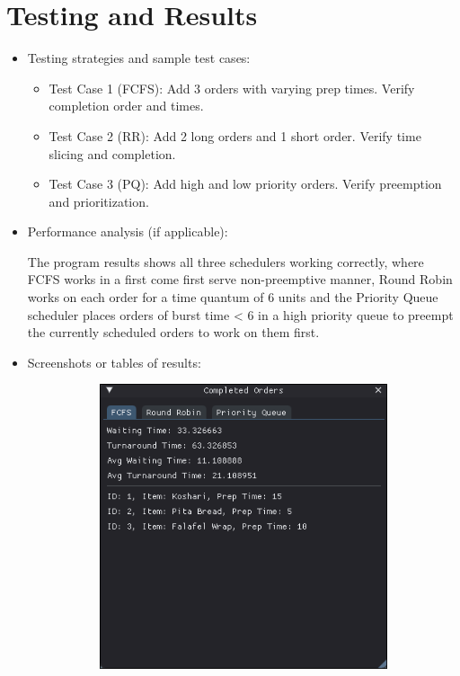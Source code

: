 \documentclass[a4paper,12pt]{article}
\begin{document}
\section{Testing and Results}
\RaggedRight %
\begin{itemize}
    \item Testing strategies and sample test cases: 

                \begin{itemize}
                    \item Test Case 1 (FCFS): Add 3 orders with varying prep times. Verify completion order and times.
                    \item Test Case 2 (RR): Add 2 long orders and 1 short order. Verify time slicing and completion.
                    \item Test Case 3 (PQ): Add high and low priority orders. Verify preemption and prioritization.
                \end{itemize}
    \item Performance analysis (if applicable):
        \begin{itemize}
           The program results shows all three schedulers working correctly, where FCFS works in a first come first serve non-preemptive manner, Round Robin works on each order for a time quantum of 6 units and the Priority Queue scheduler places orders of burst time < 6 in a high priority queue to preempt the currently scheduled orders to work on them first.
        \end{itemize}
    \item Screenshots or tables of results:
\begin{figure}[H]
    \centering
    \begin{subfigure}[b]{0.32\linewidth}
        \centering
        \includegraphics[width=\linewidth]{FCFS.png}

\end{subfigure}
\end{figure}
\end{itemize}
\end{document}
